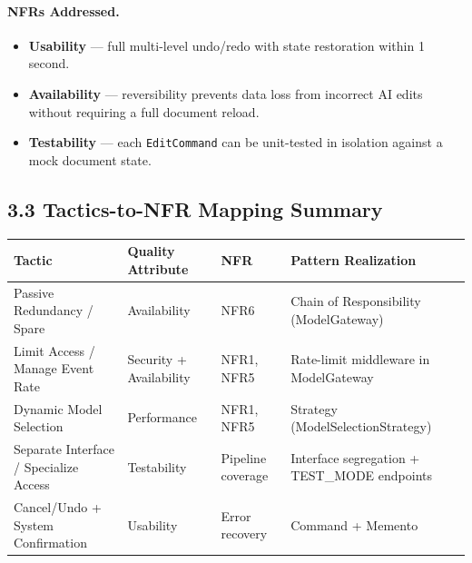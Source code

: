 \documentclass[12pt,a4paper]{article}
\begin{document}
\paragraph{NFRs Addressed.}
\begin{itemize}[nosep]
    \item \textbf{Usability} --- full multi-level undo/redo with state restoration within 1 second.
    \item \textbf{Availability} --- reversibility prevents data loss from incorrect AI edits
    without requiring a full document reload.
    \item \textbf{Testability} --- each \texttt{EditCommand} can be unit-tested in isolation
    against a mock document state.
\end{itemize}

\subsection{3.3 Tactics-to-NFR Mapping Summary}

\begin{center}
\renewcommand{\arraystretch}{1.4}
\begin{tabularx}{\textwidth}{@{}L{4.5cm}L{2.8cm}L{2.8cm}L{4.5cm}@{}}
\toprule
\textbf{Tactic} & \textbf{Quality Attribute} & \textbf{NFR} & \textbf{Pattern Realization} \\
\midrule
Passive Redundancy / Spare & Availability & NFR6 & Chain of Responsibility (ModelGateway) \\
Limit Access / Manage Event Rate & Security + Availability & NFR1, NFR5 & Rate-limit middleware in ModelGateway \\
Dynamic Model Selection & Performance & NFR1, NFR5 & Strategy (ModelSelectionStrategy) \\
Separate Interface / Specialize Access & Testability & Pipeline coverage & Interface segregation + TEST\_MODE endpoints \\
Cancel/Undo + System Confirmation & Usability & Error recovery & Command + Memento \\
\bottomrule
\end{tabularx}
\end{center}
\end{document}

